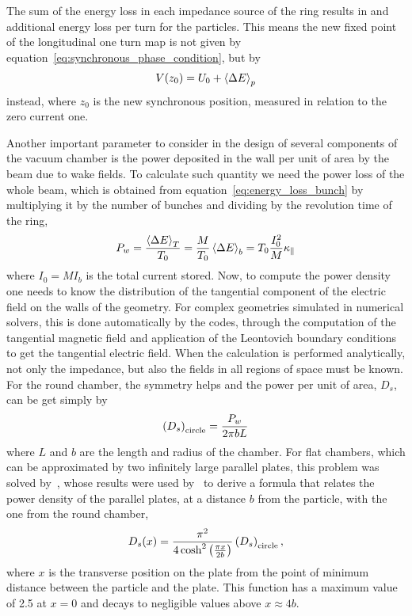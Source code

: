     The sum of the energy loss in each impedance source of the ring results in and additional energy loss per turn for the particles. This means the new fixed point of the longitudinal one turn map is not given by equation~\eqref{eq:synchronous_phase_condition}, but by
    \begin{align}
        V(z_0) = U_0 + \average[p]{\Delta E}
    \end{align}
    instead, where $z_0$ is the new synchronous position, measured in relation to the zero current one.

    Another important parameter to consider in the design of several components of the vacuum chamber is the power deposited in the wall per unit of area by the beam due to wake fields. To calculate such quantity we need the power loss of the whole beam, which is obtained from equation~\eqref{eq:energy_loss_bunch} by multiplying it by the number of bunches and dividing by the revolution time of the ring,
    \begin{align}\label{eq:total_power}
        P_w = \frac{\average[T]{\Delta E}}{T_0} = \frac{M}{T_0}\average[b]{\Delta E} =
        T_0\frac{I_0^2}{M}\kappa_\parallel
    \end{align}
    where $I_0=MI_b$ is the total current stored. Now, to compute the power density one needs to know the distribution of the tangential component of the electric field on the walls of the geometry. For complex geometries simulated in numerical solvers, this is done automatically by the codes, through the computation of the tangential magnetic field and application of the Leontovich boundary conditions~\cite[pp. 280]{Landau1961} to get the tangential electric field. When the calculation is performed analytically, not only the impedance, but also the fields in all regions of space must be known. For the round chamber, the symmetry helps and the power per unit of area, $D_s$, can be get simply by
    \begin{align}\label{eq:power_density_circle}
        \fof{D_s}_\text{circle} = \frac{P_w}{2\pi b L}
    \end{align}
    where $L$ and $b$ are the length and radius of the chamber. For flat chambers, which can be approximated by two infinitely large parallel plates, this problem was solved by~, whose results were used by~ to derive a formula that relates the power density of the parallel plates, at a distance $b$ from the particle, with the one from the round chamber,
    \begin{align}\label{eq:power_density_flat}
        D_s(x) = \frac{\pi^2}{4\cosh^2\fof{\frac{\pi x}{2b}}}\fof{D_s}_\text{circle},
    \end{align}
    where $x$ is the transverse position on the plate from the point of minimum distance between the particle and the plate. This function has a maximum value of \SI{2.5}{} at $x=0$ and decays to negligible values above $x\approx4b$.

